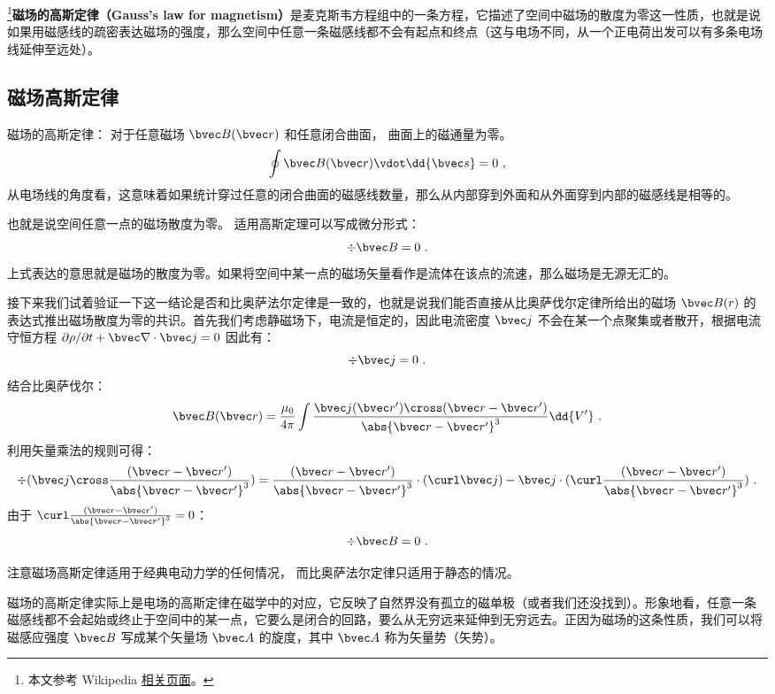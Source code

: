 
\begin{issues}
\issueDraft
\end{issues}


\footnote{本文参考 Wikipedia \href{https://en.wikipedia.org/wiki/Gauss's_law_for_magnetism}{相关页面}。}\textbf{磁场的高斯定律（Gauss's law for magnetism）}是麦克斯韦方程组中的一条方程，它描述了空间中磁场的散度为零这一性质，也就是说如果用磁感线的疏密表达磁场的强度，那么空间中任意一条磁感线都不会有起点和终点（这与电场不同，从一个正电荷出发可以有多条电场线延伸至远处）。

\subsection{磁场高斯定律}
磁场的高斯定律： 对于任意磁场 $\bvec B(\bvec r)$ 和任意闭合曲面， 曲面上的磁通量为零。
\begin{equation}
\oint \bvec B(\bvec r) \vdot \dd{\bvec s} = 0~,
\end{equation}
从电场线的角度看，这意味着如果统计穿过任意的闭合曲面的磁感线数量，那么从内部穿到外面和从外面穿到内部的磁感线是相等的。

也就是说空间任意一点的磁场散度为零。 适用高斯定理可以写成微分形式：
\begin{equation}
\div\bvec B = 0~.
\end{equation}
上式表达的意思就是磁场的散度为零。如果将空间中某一点的磁场矢量看作是流体在该点的流速，那么磁场是无源无汇的。

接下来我们试着验证一下这一结论是否和比奥萨法尔定律是一致的，也就是说我们能否直接从比奥萨伐尔定律所给出的磁场 $\bvec B(r)$ 的表达式推出磁场散度为零的共识。首先我们考虑静磁场下，电流是恒定的，因此电流密度 $\bvec j$ 不会在某一个点聚集或者散开，根据电流守恒方程 $\partial \rho/\partial t + \bvec \nabla\cdot \bvec j=0$ 因此有：
\begin{equation}
\div \bvec j = 0  ~.
\end{equation}
结合比奥萨伐尔：
\begin{equation}
\bvec B(\bvec r) = \frac{\mu_0}{4\pi} \int \frac{\bvec j(\bvec r') \cross (\bvec r - \bvec r')}{\abs{\bvec r - \bvec r'}^3} \dd{V'}~.
\end{equation}
利用矢量乘法的规则可得：
\begin{equation}
\div(\bvec j \cross \frac{(\bvec r - \bvec r')}{\abs{\bvec r - \bvec r'}^3})=\frac{(\bvec r - \bvec r')}{\abs{\bvec r - \bvec r'}^3}\cdot(\curl \bvec j)-\bvec j\cdot(\curl \frac{(\bvec r - \bvec r')}{\abs{\bvec r - \bvec r'}^3})~.
\end{equation}
由于 $\curl \frac{(\bvec r - \bvec r')}{\abs{\bvec r - \bvec r'}^3} = 0$：
\begin{equation}
\div \bvec B = 0  ~.
\end{equation}

注意磁场高斯定律适用于经典电动力学的任何情况， 而比奥萨法尔定律只适用于静态的情况。

磁场的高斯定律实际上是电场的高斯定律在磁学中的对应，它反映了自然界没有孤立的磁单极（或者我们还没找到）。形象地看，任意一条磁感线都不会起始或终止于空间中的某一点，它要么是闭合的回路，要么从无穷远来延伸到无穷远去。正因为磁场的这条性质，我们可以将磁感应强度 $\bvec B$ 写成某个矢量场 $\bvec A$ 的旋度，其中 $\bvec A$ 称为矢量势（矢势）。
